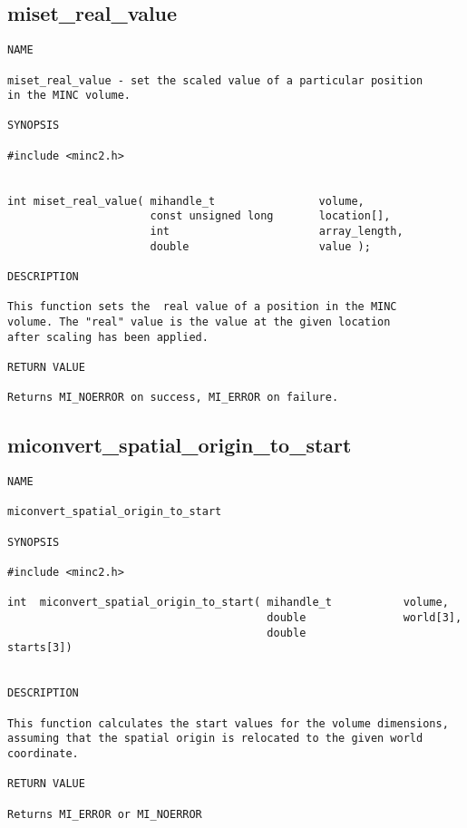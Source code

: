 \documentclass{article}
\begin{document}
\subsection{miset\_real\_value}
\begin{verbatim}
NAME

miset_real_value - set the scaled value of a particular position 
in the MINC volume.

SYNOPSIS

#include <minc2.h>


int miset_real_value( mihandle_t                volume,
                      const unsigned long       location[],
                      int                       array_length,
                      double                    value );

DESCRIPTION

This function sets the  real value of a position in the MINC
volume. The "real" value is the value at the given location 
after scaling has been applied.

RETURN VALUE

Returns MI_NOERROR on success, MI_ERROR on failure.
\end{verbatim}

\subsection{miconvert\_spatial\_origin\_to\_start}
\begin{verbatim}
NAME 

miconvert_spatial_origin_to_start

SYNOPSIS

#include <minc2.h>

int  miconvert_spatial_origin_to_start( mihandle_t           volume,
                                        double               world[3],
                                        double               starts[3])
                       
                                
DESCRIPTION

This function calculates the start values for the volume dimensions,
assuming that the spatial origin is relocated to the given world
coordinate.

RETURN VALUE

Returns MI_ERROR or MI_NOERROR

\end{verbatim}
\end{document}
